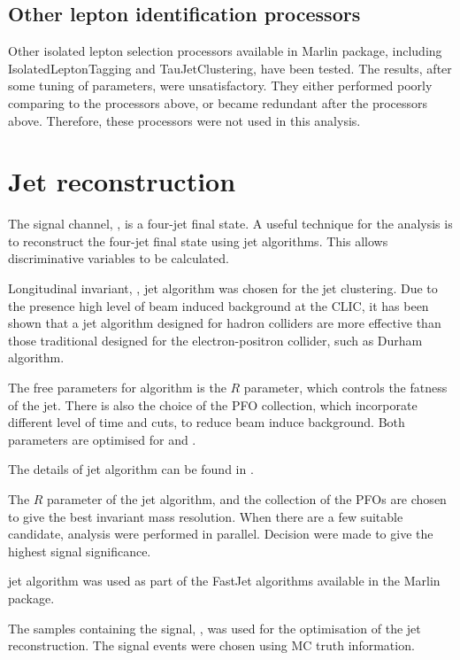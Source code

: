 \subsection{Other lepton identification processors}

Other isolated lepton selection processors available in Marlin package, including IsolatedLeptonTagging and TauJetClustering, have been tested. The results, after some tuning of parameters, were unsatisfactory. They either performed poorly comparing to the processors above, or became redundant after the processors above. Therefore, these processors were not used in this analysis.

\section{Jet reconstruction}

The signal channel, \eeToHHbbWWHad, is a four-jet final state. A useful technique for the analysis is to reconstruct the four-jet final state using jet algorithms. This allows discriminative variables to be calculated.

Longitudinal invariant, \kt, jet algorithm was chosen for the jet clustering. Due to the presence high level of beam induced background at the CLIC, it has been shown that a jet algorithm designed for hadron colliders are more effective than those traditional designed for the electron-positron collider, such as Durham algorithm.\cite{}

The free parameters for \kt algorithm is the $R$ parameter, which controls the fatness of the jet. There is also the choice of the PFO collection, which incorporate different level of time and \pT cuts, to reduce beam induce background. Both parameters are optimised for  and .

The details of jet algorithm can be found in \Section{}.

The $R$ parameter of the \kt jet algorithm, and the collection of the PFOs are chosen to give the best invariant mass resolution. When there are a few suitable candidate, analysis were performed in parallel. Decision were made to give the highest signal significance.

\kt jet algorithm was used as part of the FastJet algorithms available in the Marlin package.

The samples containing the signal, \eeToHHbbWWHad, was used for the optimisation of the jet reconstruction. The signal events were chosen using MC truth information.

